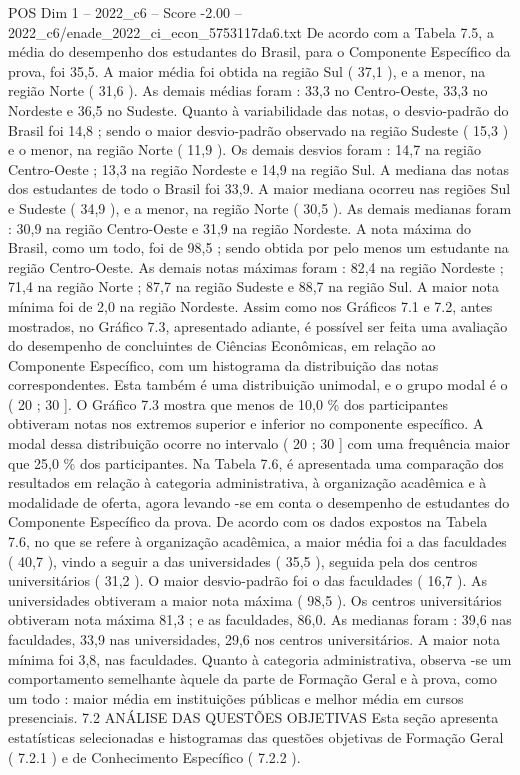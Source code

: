 \begin{textsample}{POS Dim 1 – 2022\_c6 – Score -2.00 – 2022\_c6/enade\_2022\_ci\_econ\_5753117da6.txt}
De acordo com a Tabela 7.5, a média do desempenho dos estudantes do Brasil, para o Componente Específico da prova, foi 35,5.
A maior média foi obtida na região Sul ( 37,1 ), e a menor, na região Norte ( 31,6 ).
As demais médias foram : 33,3 no Centro-Oeste, 33,3 no Nordeste e 36,5 no Sudeste.
Quanto à variabilidade das notas, o desvio-padrão do Brasil foi 14,8 ; sendo o maior desvio-padrão observado na região Sudeste ( 15,3 ) e o menor, na região Norte ( 11,9 ).
Os demais desvios foram : 14,7 na região Centro-Oeste ; 13,3 na região Nordeste e 14,9 na região Sul.
A mediana das notas dos estudantes de todo o Brasil foi 33,9.
A maior mediana ocorreu nas regiões Sul e Sudeste ( 34,9 ), e a menor, na região Norte ( 30,5 ).
As demais medianas foram : 30,9 na região Centro-Oeste e 31,9 na região Nordeste.
A nota máxima do Brasil, como um todo, foi de 98,5 ; sendo obtida por pelo menos um estudante na região Centro-Oeste.
As demais notas máximas foram : 82,4 na região Nordeste ; 71,4 na região Norte ; 87,7 na região Sudeste e 88,7 na região Sul.
A maior nota mínima foi de 2,0 na região Nordeste.
Assim como nos Gráficos 7.1 e 7.2, antes mostrados, no Gráfico 7.3, apresentado adiante, é possível ser feita uma avaliação do desempenho de concluintes de Ciências Econômicas, em relação ao Componente Específico, com um histograma da distribuição das notas correspondentes.
Esta também é uma distribuição unimodal, e o grupo modal é o ( 20 ; 30 ].
O Gráfico 7.3 mostra que menos de 10,0 \% dos participantes obtiveram notas nos extremos superior e inferior no componente específico.
A modal dessa distribuição ocorre no intervalo ( 20 ; 30 ] com uma frequência maior que 25,0 \% dos participantes.
Na Tabela 7.6, é apresentada uma comparação dos resultados em relação à categoria administrativa, à organização acadêmica e à modalidade de oferta, agora levando -se em conta o desempenho de estudantes do Componente Específico da prova.
De acordo com os dados expostos na Tabela 7.6, no que se refere à organização acadêmica, a maior média foi a das faculdades ( 40,7 ), vindo a seguir a das universidades ( 35,5 ), seguida pela dos centros universitários ( 31,2 ).
O maior desvio-padrão foi o das faculdades ( 16,7 ).
As universidades obtiveram a maior nota máxima ( 98,5 ).
Os centros universitários obtiveram nota máxima 81,3 ; e as faculdades, 86,0.
As medianas foram : 39,6 nas faculdades, 33,9 nas universidades, 29,6 nos centros universitários.
A maior nota mínima foi 3,8, nas faculdades.
Quanto à categoria administrativa, observa -se um comportamento semelhante àquele da parte de Formação Geral e à prova, como um todo : maior média em instituições públicas e melhor média em cursos presenciais. 7.2 ANÁLISE DAS QUESTÕES OBJETIVAS Esta seção apresenta estatísticas selecionadas e histogramas das questões objetivas de Formação Geral ( 7.2.1 ) e de Conhecimento Específico ( 7.2.2 ).

\end{textsample}
